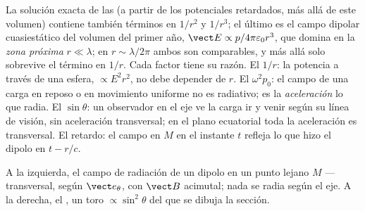 \begin{remark}\label{rem:b2:dipole-radiation:reading}
La solución exacta de las  (a partir de los
potenciales retardados, más allá de este volumen) contiene también términos en $1/r^2$ y
$1/r^3$; el último es el campo dipolar cuasiestático del volumen del
primer año, $\vect E \propto p/4\pi\varepsilon_0r^3$, que domina en la \emph{zona
próxima} $r \ll \lambda$; en $r \sim \lambda/2\pi$ ambos son comparables, y más allá
solo sobrevive el término en $1/r$. Cada factor tiene su razón. El $1/r$: la
potencia a través de una esfera, $\propto E^2r^2$, no debe depender de $r$. El $\omega^2p_0$:
el campo de una carga en reposo o en movimiento uniforme no es radiativo; es
la \emph{aceleración} lo que radia. El $\sin\theta$: un observador en el
eje ve la carga ir y venir según su línea de visión, sin
aceleración transversal; en el plano ecuatorial toda la
aceleración es transversal. El retardo: el campo en $M$ en el instante $t$
refleja lo que hizo el dipolo en $t - r/c$.
\end{remark}

\begin{omfigure}

{\small A la izquierda, el campo de radiación de un dipolo en un punto lejano $M$ ---
transversal, según $\vect e_\theta$, con $\vect B$ acimutal; nada se
radia según el eje. A la derecha, el , un toro
$\propto\sin^2\theta$ del que se dibuja la sección.}
\end{omfigure}

